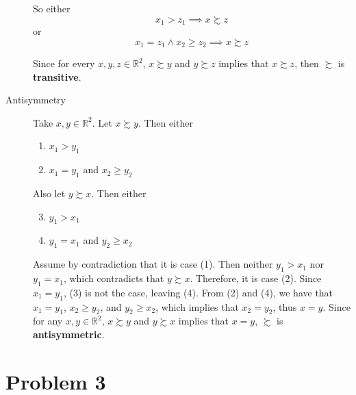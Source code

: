 \documentclass[12pt]{extarticle}
\numberwithin{table}{section}
\numberwithin{figure}{section}
\numberwithin{equation}{section}
\begin{document}
\begin{description}
          So either
          \begin{equation}
              x_1 > z_1 \implies x \succsim z
          \end{equation}
          or
          \begin{equation}
              x_1 = z_1 \land x_2 \ge z_2 \implies x \succsim z
          \end{equation}

          Since for every $x, y, z \in \mathbb{R}^2$, $x \succsim y$ and $y \succsim z$ implies that $x \succsim z$, then $\succsim$ is \textbf{transitive}.
    \item[Antisymmetry]
          Take $x, y \in \mathbb{R}^2$. Let $x \succsim y$.
          Then either
          \begin{enumerate}
              \item $x_1 > y_1$
              \item $x_1 = y_1$ and $x_2 \ge y_2$
          \end{enumerate}
          Also let $y \succsim x$. Then either
          \begin{enumerate}
              \setcounter{enumi}{2}
              \item $y_1 > x_1$
              \item $y_1 = x_1$ and $y_2 \ge x_2$
          \end{enumerate}
          Assume by contradiction that it is case (1).
          Then neither $y_1 > x_1$ nor $y_1 = x_1$, which contradicts that $y \succsim x$. Therefore, it is case (2).
          Since $x_1 = y_1$, (3) is not the case, leaving (4).
          From (2) and (4), we have that $x_1 = y_1$, $x_2 \ge y_2$, and $y_2 \ge x_2$, which implies that $x_2 = y_2$, thus $x = y$. Since for any $x, y \in \mathbb{R}^2$, $x \succsim y$ and $y \succsim x$ implies that $x = y$, $\succsim$ is \textbf{antisymmetric}.
\end{description}

\section{Problem 3}
\end{document}
